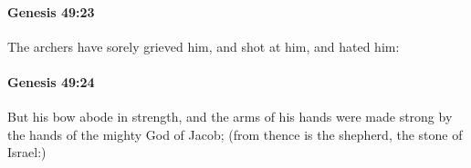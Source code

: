 		\paragraph{Genesis 49:23} %
			\label{GENESIS-49-23}

			The archers have sorely grieved him, and shot at him, and hated him:


		\paragraph{Genesis 49:24} %
			\label{GENESIS-49-24}

			But his bow abode in strength, and the arms of his hands were made strong by the hands of the mighty God of Jacob; (from thence is the shepherd, the stone of Israel:)


